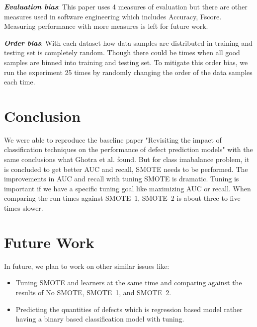 \documentclass[sigconf,review, anonymous]{acmart}
\newcommand{\bi}{\begin{itemize}[leftmargin=0.4cm]}
\newcommand{\ei}{\end{itemize}}
\theoremstyle{break}
\begin{document}
\textbf{\textit{Evaluation bias}}: This paper uses 4 measures of evaluation but there are other measures used in software engineering which includes Accuracy, Fscore. Measuring performance with more measures is left for future work.

\textbf{\textit{Order bias}}: With each dataset how data samples are distributed in training and testing set is completely random. Though there could be times when all good samples are binned into training and testing set. To mitigate this order bias, we run
the experiment 25 times by randomly changing the order of the data samples each time.

\section{Conclusion}
\label{sect:conclusion}

We were able to reproduce the baseline paper "Revisiting the impact of classification techniques on the performance of defect prediction models" with the same conclusions what Ghotra et al. found. But for class imabalance problem, it is concluded to get better AUC and recall, SMOTE needs to be performed. The improvements in AUC and recall with tuning SMOTE is dramatic. Tuning is important if we have a specific tuning goal like maximizing AUC or recall. When comparing the run times against SMOTE~1, SMOTE~2 is about three to five times slower.

\section{Future Work}
\label{sect:future}
In future, we plan to work on other similar issues like:
\bi
 \item Tuning SMOTE and learners at the same time and comparing against the results of No SMOTE, SMOTE~1, and SMOTE~2.
 \item Predicting the quantities of defects which is regression based model rather having a binary based classification model with tuning.
\ei

\balance


\medskip

\end{document}
